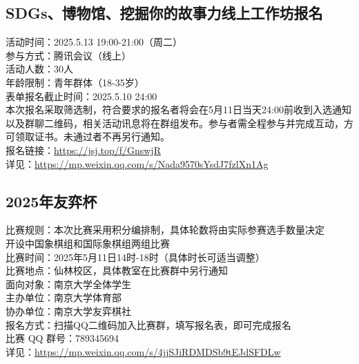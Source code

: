 \documentclass[letterpaper, 12pt]{article}
\begin{document}
\begin{multicols}{2}
\subsection{SDGs、博物馆、挖掘你的故事力线上工作坊报名} %
活动时间：2025.5.13  19:00-21:00（周二）
\\参与方式：腾讯会议（线上）
\\活动人数：30人
\\年龄限制：青年群体（18-35岁）
\\表单报名截止时间：2025.5.10 24:00
\\本次报名采取筛选制，符合要求的报名者将会在5月11日当天24:00前收到入选通知以及群聊二维码，相关活动讯息将在群组发布。参与者需全程参与并完成互动，方可领取证书。未通过者不再另行通知。
\\报名链接：\url{https://jsj.top/f/GnswjR}
\\详见：\url{https://mp.weixin.qq.com/s/Nada9570sYsdJ7fzlXn1Ag}

\subsection{2025年友弈杯} %
比赛规则：本次比赛采用积分编排制，具体轮数将由实际参赛选手数量决定
\\开设中国象棋组和国际象棋组两组比赛
\\比赛时间：2025年5月11日14时-18时（具体时长可适当调整）
\\比赛地点：仙林校区，具体教室在比赛群中另行通知
\\面向对象：南京大学全体学生
\\主办单位：南京大学体育部
\\协办单位：南京大学友弈棋社
\\报名方式：扫描QQ二维码加入比赛群，填写报名表，即可完成报名
\\比赛 QQ 群号：789345694
\\详见：\url{https://mp.weixin.qq.com/s/4jjSJiRDMDSb9tEJdSFDLw}

\end{multicols}
\end{document}
